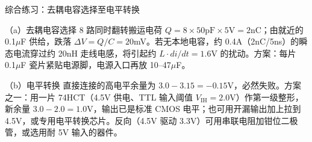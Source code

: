 \begin{chapteranswer}{综合练习：去耦电容选择至电平转换}
\begin{answersubproblem}{（a）去耦电容选择}
8 路同时翻转搬运电荷 $Q=8\times50\mathrm{pF}\times5\mathrm{V}=2$nC；由就近的 0.1$\mu$F 供给，跌落 $\Delta V=Q/C=20$mV。若无本地电容，约 0.4A（2nC/5ns）的瞬态电流穿过约 20nH 走线电感，将引起约 $L\cdot di/dt=1.6$V 的扰动。方案：每片 0.1$\mu$F 瓷片紧贴电源脚，电源入口再放 10–47$\mu$F。
\end{answersubproblem}
\begin{answersubproblem}{（b）电平转换}
直接连接的高电平余量为 $3.0-3.15=-0.15$V，必然失败。方案之一：用一片 74HCT（4.5V 供电、TTL 输入阈值 $V_\mathrm{IH}=2.0$V）作第一级整形，新余量 $3.0-2.0=1.0$V，输出已是标准 CMOS 电平；也可用开漏输出加上拉到 4.5V，或专用电平转换芯片。反向（4.5V 驱动 3.3V）可用串联电阻加钳位二极管，或选用耐 5V 输入的器件。
\end{answersubproblem}
\end{chapteranswer}
